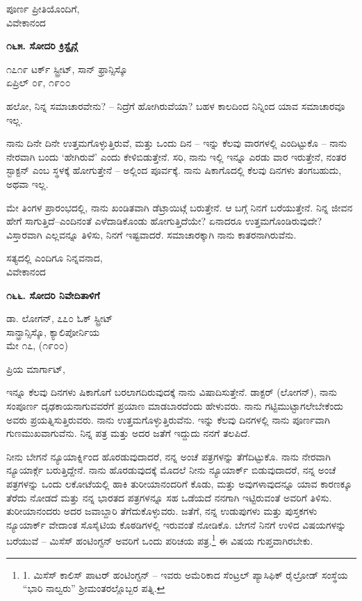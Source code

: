 \begin{flushright}
ಪೂರ್ಣ ಪ್ರೀತಿಯೊಂದಿಗೆ,\\ವಿವೇಕಾನಂದ
\end{flushright}

\begin{center}
\textbf{೧೬೫. ಸೋದರಿ ಕ್ರಿಸ್ಟೈನ್ಗೆ}
\end{center}

\begin{flushright}
೧೭೧೯ ಟರ್ಕ್ ಸ್ಟ್ರೀಟ್, ಸಾನ್ ಫ್ರಾನ್ಸಿಸ್ಕೊ\\ಏಪ್ರಿಲ್ ೦೯, ೧೯೦೦
\end{flushright}

ಹಲೋ, ನಿನ್ನ ಸಮಾಚಾರವೇನು? – ನಿದ್ರೆಗೆ ಹೋಗಿರುವೆಯಾ? ಬಹಳ ಕಾಲದಿಂದ ನಿನ್ನಿಂದ ಯಾವ ಸಮಾಚಾರವೂ ಇಲ್ಲ.

ನಾನು ದಿನೇ ದಿನೇ ಉತ್ತಮಗೊಳ್ಳುತ್ತಿರುವೆ, ಮತ್ತು ಒಂದು ದಿನ – ಇನ್ನು ಕೆಲವು ವಾರಗಳಲ್ಲಿ ಎಂದಿಟ್ಟುಕೊ – ನಾನು ನೇರವಾಗಿ ಬಂದು ‘ಹೇಗಿರುವೆ’ ಎಂದು ಕೇಳಿಬಿಡುತ್ತೇನೆ. ಸರಿ, ನಾನು ಇಲ್ಲಿ ಇನ್ನೂ ಎರಡು ವಾರ ಇರುತ್ತೇನೆ, ನಂತರ ಸ್ಟಾಕ್ಟನ್ ಎಂಬ ಸ್ಥಳಕ್ಕೆ ಹೋಗುತ್ತೇನೆ – ಅಲ್ಲಿಂದ ಪೂರ್ವಕ್ಕೆ. ನಾನು ಷಿಕಾಗೊದಲ್ಲಿ ಕೆಲವು ದಿನಗಳು ತಂಗಬಹುದು, ಅಥವಾ ಇಲ್ಲ.

ಮೇ ತಿಂಗಳ ಪ್ರಾರಂಭದಲ್ಲಿ, ನಾನು ಖಂಡಿತವಾಗಿ ಡೆಟ್ರಾಯಿಟ್ಗೆ ಬರುತ್ತೇನೆ. ಆ ಬಗ್ಗೆ ನಿನಗೆ ಬರೆಯುತ್ತೇನೆ. ನಿನ್ನ ಜೀವನ ಹೇಗೆ ಸಾಗುತ್ತಿದೆ–ಎಂದಿನಂತೆ ಎಳೆದಾಡಿಕೊಂಡು ಹೋಗುತ್ತಿದೆಯೇ? ಏನಾದರೂ ಉತ್ತಮಗೊಂಡಿರುವುದೇ? ವಿಸ್ತಾರವಾಗಿ ಎಲ್ಲವನ್ನೂ ತಿಳಿಸು, ನಿನಗೆ ಇಷ್ಟವಾದರೆ. ಸಮಾಚಾರಕ್ಕಾಗಿ ನಾನು ಕಾತರನಾಗಿರುವೆನು.

\begin{flushright}
ಸತ್ಯದಲ್ಲಿ ಎಂದಿಗೂ ನಿನ್ನವನಾದ,\\ವಿವೇಕಾನಂದ
\end{flushright}

\begin{center}
\textbf{೧೬೬. ಸೋದರಿ ನಿವೇದಿತಾಳಿಗೆ}
\end{center}

\begin{flushright}
 ಡಾ. ಲೋಗನ್, ೭೭೦ ಓಕ್ ಸ್ಟ್ರೀಟ್\\ಸಾನ್ಫ್ರಾನ್ಸಿಸ್ಕೊ, ಕ್ಯಾಲಿಪೋರ್ನಿಯ\\ಮೇ ೧೭, (೧೯೦೦)
\end{flushright}

ಪ್ರಿಯ ಮಾರ್ಗಾಟ್,

ಇನ್ನೂ ಕೆಲವು ದಿನಗಳು ಷಿಕಾಗೊಗೆ ಬರಲಾಗದಿರುವುದಕ್ಕೆ ನಾನು ವಿಷಾದಿಸುತ್ತೇನೆ. ಡಾಕ್ಟರ್ (ಲೋಗನ್), ನಾನು ಸಂಪೂರ್ಣ ದೃಢಕಾಯನಾಗುವವರೆಗೆ ಪ್ರಯಾಣ ಮಾಡಬಾರದೆಂದು ಹೇಳುವರು. ನಾನು ಗಟ್ಟಿಮುಟ್ಟಾಗಲೇಬೇಕೆಂದು ಅವರು ಪ್ರಯತ್ನಿಸುತ್ತಿರುವರು. ನಾನು ಉತ್ತಮಗೊಳ್ಳುತ್ತಿರುವೆನು. ಇನ್ನು ಕೆಲವು ದಿನಗಳಲ್ಲಿ ನಾನು ಪೂರ್ಣವಾಗಿ ಗುಣಮುಖವಾಗುವೆನು. ನಿನ್ನ ಪತ್ರ ಮತ್ತು ಅದರ ಜತೆಗೆ ಇದ್ದುದು ನನಗೆ ತಲಪಿದೆ.

ನೀನು ಬೇಗನೆ ನ್ಯೂಯಾರ್ಕ್ನಿಂದ ಹೊರಡುವುದಾದರೆ, ನನ್ನ ಅಂಚೆ ಪತ್ರಗಳನ್ನು ತೆಗೆದಿಟ್ಟುಕೊ. ನಾನು ನೇರವಾಗಿ ನ್ಯೂಯಾರ್ಕ್ಗೆ ಬರುತ್ತಿದ್ದೇನೆ. ನಾನು ಹೊರಡುವುದಕ್ಕೆ ಮೊದಲೆ ನೀನು ನ್ಯೂಯಾರ್ಕ್ ಬಿಡುವುದಾದರೆ, ನನ್ನ ಅಂಚೆ ಪತ್ರಗಳನ್ನು ಒಂದು ಲಕೋಟೆಯಲ್ಲಿ ಹಾಕಿ ತುರೀಯಾನಂದರಿಗೆ ಕೊಡು, ಮತ್ತು ಅವುಗಳಾವುದನ್ನೂ ಯಾವ ಕಾರಣಕ್ಕೂ ತೆರೆದು ನೋಡದೆ ಮತ್ತು ನನ್ನ ಭಾರತದ ಪತ್ರಗಳನ್ನೂ ಸಹ ಒಡೆಯದೆ ನನಗಾಗಿ ಇಟ್ಟಿರುವಂತೆ ಅವರಿಗೆ ತಿಳಿಸು. ತುರೀಯಾನಂದರು ಅದರ ಜವಾಬ್ದಾರಿ ತೆಗೆದುಕೊಳ್ಳುವರು. ಜತೆಗೆ, ನನ್ನ ಉಡುಪುಗಳು ಮತ್ತು ಪುಸ್ತಕಗಳು ನ್ಯೂಯಾರ್ಕ್ ವೇದಾಂತ ಸೊಸೈಟಿಯ ಕೊಠಡಿಗಳಲ್ಲಿ ಇರುವಂತೆ ನೋಡಿಕೊ. ಬೇಗನೆ ನಿನಗೆ ಉಳಿದ ವಿಷಯಗಳನ್ನು ಬರೆಯುವೆ – ಮಿಸೆಸ್ ಹಂಟಿಂಗ್ಟನ್ ಅವರಿಗೆ ಒಂದು ಪರಿಚಯ ಪತ್ರ.\footnote{1. ಮಿಸೆಸ್ ಕಾಲಿಸ್ ಪಾಟರ್ ಹಂಟಿಂಗ್ಟನ್ – ಇವರು ಅಮೆರಿಕಾದ ಸೆಂಟ್ರಲ್ ಪ್ಯಾಸಿಫಿಕ್ ರೈಲ್ರೋಡ್ ಸಂಸ್ಥೆಯ “ಭಾರಿ ನಾಲ್ವರು” ಶ‍್ರೀಮಂತರಲ್ಲೊಬ್ಬರ ಪತ್ನಿ.} ಈ ವಿಷಯ ಗುಪ್ತವಾಗಿರಬೇಕು.

